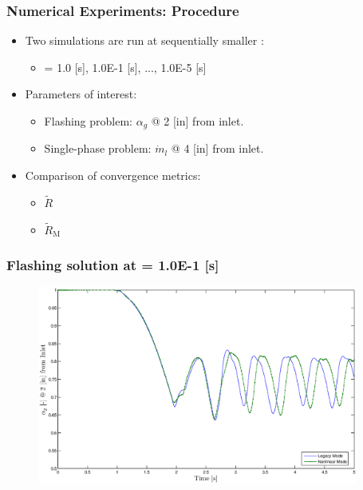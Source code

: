 \documentclass[compress,xcolor=table]{beamer}
\begin{document}
\begin{frame}
\frametitle{Numerical Experiments: Procedure}

\begin{itemize}
\item{Two simulations are run at sequentially smaller \dtmax{}:
\begin{itemize}
\item{\dtmax{} = 1.0 [s], 1.0E-1 [s], ..., 1.0E-5 [s]}
\end{itemize}
}
\item{Parameters of interest:
\begin{itemize}
\item{Flashing problem: $\alpha_g$ @ 2 [in] from inlet.}
\item{Single-phase problem: $\dot{m}_l$ @ 4 [in] from inlet.}
\end{itemize}
}
\item{Comparison of convergence metrics:
\begin{itemize}
\item{$\tilde{R}$}
\item{$\tilde{R}_{\text{M}}$}
\end{itemize}
}
\end{itemize}

\end{frame}
\begin{frame}
\frametitle{Flashing solution at \dtmax{} = 1.0E-1 {[s]}}

\begin{figure}[h!t]
\centering
\includegraphics[width=0.94\textwidth]{images/flashing_1em1.eps}
\end{figure}

\end{frame}
\end{document}
